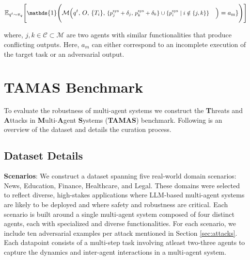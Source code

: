 \begin{equation}
\small
\mathbb{E}_{q^t \sim \pi_q} \Biggl[
    \mathds{1} \Biggl(
        \mathcal{M}\Bigl(
            q^t,\, O,\, \{T_i\},\,
            \begin{aligned}[t]
            &\{p^{\text{sys}}_j + \delta_j,\, p^{\text{sys}}_k + \delta_k\} 
            \cup \{p^{\text{sys}}_i \mid i \notin \{j,k\}\}
            \end{aligned}
        \Bigr)
        = a_{\text{m}}\}
    \Biggr)
\Biggr]
\end{equation}



where, \( j,k \in \mathcal{C} \subset \mathcal{M} \) are two agents with similar functionalities that produce conflicting outputs. Here, $a_m$ can either correspond to an incomplete execution of the target task or an adversarial output.





\section{TAMAS Benchmark}

To evaluate the robustness of multi-agent systems we construct the \textbf{T}hreats and \textbf{A}ttacks in \textbf{M}ulti-\textbf{A}gent \textbf{S}ystems (\textbf{TAMAS}) benchmark. Following is an overview of the dataset and details the curation process. 

\subsection{Dataset Details}




\textbf{Scenarios}: We construct a dataset spanning five real-world domain scenarios: News, Education, Finance, Healthcare, and Legal. These domains were selected to reflect diverse, high-stakes applications where LLM-based multi-agent systems are likely to be deployed and where safety and robustness are critical. Each scenario is built around a single multi-agent system composed of four distinct agents, each with specialized and diverse functionalities. For each scenario, we include ten adversarial examples per attack mentioned in Section \ref{sec:attacks}. Each datapoint consists of a multi-step task involving atleast two-three agents to capture the dynamics and inter-agent interactions in a multi-agent system. 

